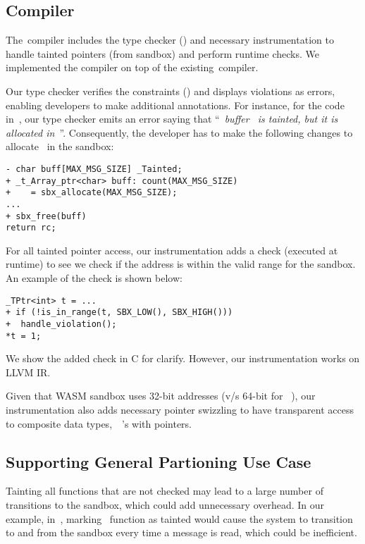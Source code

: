 \subsection{Compiler}
The~\systemname compiler includes the type checker (\sect{}) and necessary instrumentation to handle tainted pointers (\ie from sandbox) and perform runtime checks.
We implemented the compiler on top of the existing~\checkedc compiler.

Our type checker verifies the constraints () and displays violations as errors, enabling developers to make additional annotations.
For instance, for the code in~, our type checker emits an error saying that ``~\emph{buffer~ is tainted, but it is allocated in~\cregion}''.
Consequently, the developer has to make the following changes to allocate~ in the sandbox:
\begin{verbatim}
- char buff[MAX_MSG_SIZE] _Tainted;
+ _t_Array_ptr<char> buff: count(MAX_MSG_SIZE)
+    = sbx_allocate(MAX_MSG_SIZE);
...
+ sbx_free(buff)
return rc;
\end{verbatim}

For all tainted pointer access, our instrumentation adds a check (executed at runtime) to see we check if the address is within the valid range for the sandbox. An example of the check is shown below:
\begin{verbatim}
_TPtr<int> t = ...
+ if (!is_in_range(t, SBX_LOW(), SBX_HIGH()))
+  handle_violation();
*t = 1;
\end{verbatim}
We show the added check in C for clarify. However, our instrumentation works on LLVM IR.

Given that WASM sandbox uses 32-bit addresses (v/s 64-bit for~
\cregion), our instrumentation also adds necessary pointer swizzling to have transparent access to composite data types,~\ie~'s with pointers.

\subsection{Supporting General Partioning Use Case}


Tainting all functions that are not checked may lead to a large number of transitions to the sandbox, which could add unnecessary overhead. In our example, in~, marking~ function as tainted would cause the system to transition to and from the sandbox every time a message is read, which could be inefficient. 

